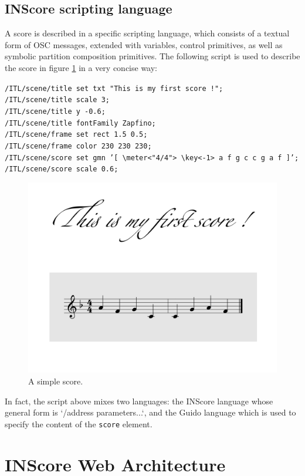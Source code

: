 \documentclass{article}
\newcommand{\icode}[1]	{\texttt{#1}}
\newcommand{\code}[1]	{\vspace{-0.2em}\begin{center}\colorbox{mygrey}{\begin{minipage}[t]{0.98\columnwidth} {\scriptsize \texttt{#1}}\end{minipage}}\end{center}}
\begin{document}
\subsection{INScore scripting language}
A score is described in a specific scripting language, which consists of a textual form of OSC messages, extended with variables, control primitives, as well as symbolic partition composition primitives. The following script is used to describe the score in figure \ref{fig:score} in a very concise way:
\code{/ITL/scene/title set txt "This is my first score !"; \\
/ITL/scene/title scale 3;\\
/ITL/scene/title y -0.6;\\
/ITL/scene/title fontFamily Zapfino;\\
/ITL/scene/frame set rect 1.5 0.5;\\
/ITL/scene/frame color 230 230 230;\\
/ITL/scene/score set gmn 
   '[ \textbackslash meter<"4/4"> \textbackslash key<-1> a f g c c g a f ]';\\
/ITL/scene/score scale 0.6;}

\begin{figure}[h]
\centering
\includegraphics[width=0.7\columnwidth]{rsrc/inscore-exemple.png}
\caption{A simple score.}
\label{fig:score}
\end{figure}
In fact, the script above mixes two languages: the INScore language whose general form is `/address parameters...`, and the Guido language \cite{hoos98} which is used to specify the content of the \icode{score} element.

\section{INScore Web Architecture}\label{sec:arch}
\end{document}
